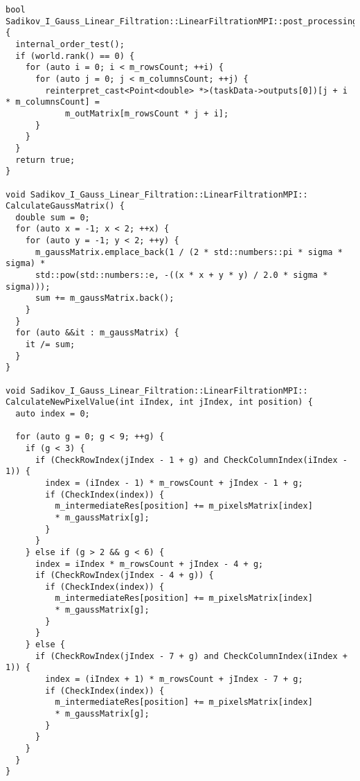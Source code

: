 \documentclass[a4paper,14pt]{report}
\begin{document}
\begin{verbatim}
bool Sadikov_I_Gauss_Linear_Filtration::LinearFiltrationMPI::post_processing() {
  internal_order_test();
  if (world.rank() == 0) {
    for (auto i = 0; i < m_rowsCount; ++i) {
      for (auto j = 0; j < m_columnsCount; ++j) {
        reinterpret_cast<Point<double> *>(taskData->outputs[0])[j + i * m_columnsCount] =
            m_outMatrix[m_rowsCount * j + i];
      }
    }
  }
  return true;
}

void Sadikov_I_Gauss_Linear_Filtration::LinearFiltrationMPI::
CalculateGaussMatrix() {
  double sum = 0;
  for (auto x = -1; x < 2; ++x) {
    for (auto y = -1; y < 2; ++y) {
      m_gaussMatrix.emplace_back(1 / (2 * std::numbers::pi * sigma * sigma) *
      std::pow(std::numbers::e, -((x * x + y * y) / 2.0 * sigma * sigma)));
      sum += m_gaussMatrix.back();
    }
  }
  for (auto &&it : m_gaussMatrix) {
    it /= sum;
  }
}

void Sadikov_I_Gauss_Linear_Filtration::LinearFiltrationMPI::
CalculateNewPixelValue(int iIndex, int jIndex, int position) {
  auto index = 0;

  for (auto g = 0; g < 9; ++g) {
    if (g < 3) {
      if (CheckRowIndex(jIndex - 1 + g) and CheckColumnIndex(iIndex - 1)) {
        index = (iIndex - 1) * m_rowsCount + jIndex - 1 + g;
        if (CheckIndex(index)) {
          m_intermediateRes[position] += m_pixelsMatrix[index] 
          * m_gaussMatrix[g];
        }
      }
    } else if (g > 2 && g < 6) {
      index = iIndex * m_rowsCount + jIndex - 4 + g;
      if (CheckRowIndex(jIndex - 4 + g)) {
        if (CheckIndex(index)) {
          m_intermediateRes[position] += m_pixelsMatrix[index] 
          * m_gaussMatrix[g];
        }
      }
    } else {
      if (CheckRowIndex(jIndex - 7 + g) and CheckColumnIndex(iIndex + 1)) {
        index = (iIndex + 1) * m_rowsCount + jIndex - 7 + g;
        if (CheckIndex(index)) {
          m_intermediateRes[position] += m_pixelsMatrix[index]
          * m_gaussMatrix[g];
        }
      }
    }
  }
}
\end{verbatim}
\end{document}
